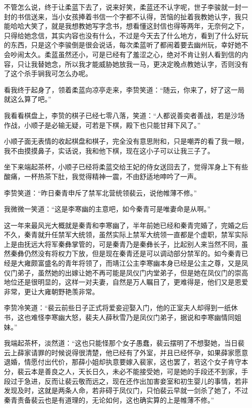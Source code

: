 不管怎么说，终于让柔蓝下去了，说来好笑，柔蓝还不认字呢，世子李骏就一封一封的书信送来，当小女孩捧着书信一个字都不认得，苦恼的扯着我教她认字，我只能哈哈大笑了，就是我想教她写字念书，想看懂这封信也得等两年，无奈何之下，只得给她念信，其实内容也没有什么，不过是今天去了什么地方，看到了什么好玩的东西，只是这个李骏倒是很会说话，每次柔蓝听了都闹着要去幽州玩，幸好她不会吵闹太久。柔蓝虽然还小，可是已经有了羞涩之心，绝对不肯让别人看到信的内容，只让我替她念，所以我才能威胁她放我一马，更决定晚点教她认字，否则没有了这个杀手锏我可怎么办呢。

看我终于起身了，领着柔蓝向凉亭走来，李贽笑道：“随云，你来了，好了这一局就这么算了吧。”

我看看棋盘上，李贽的棋子已经七零八落，笑道：“人都说善奕者善战，若是沙场作战，小顺子是必输无疑，可若是下棋，殿下也只能甘拜下风了。”

小顺子面无表情的收起棋盘和棋子，完全没有意思附和，只是嘲弄的看了我一眼，我不由摸摸鼻子，实话说，我和他下棋，现在这小子可以让我三子了。

坐下来端起茶杯，小顺子已经将柔蓝交给王妃的侍女送回去了，觉得浑身上下有些酸痛，一杯热茶下肚，我觉得精神一震，不由舒适地呻吟了一声。

李贽笑道：“昨日秦青申斥了禁军北营统领裴云，说他帷薄不修。”

我微微一笑道：“这是李寒幽的主意吧，如今秦青可是唯妻命是从啊。”

这一年来最风光大概就是秦青和李寒幽了，半年前她已经和秦青完婚了，完婚之后不久，秦青就升任禁军大统领，虽然实际上禁军大统领一直都是个虚职，禁军实际上是由抚远大将军秦彝掌管的，可是秦青乃是秦彝长子，比起别人来当然不同，虽然秦彝仍然没有将权力下放，但是现在秦青还是可以调动部分禁军的。如今秦青已经是大雍颇富盛名的青年将领了，而靖江公主李寒幽本身已经是公主之尊，又是凤仪门弟子，虽然她的出嫁让她不再可能是凤仪门内堂弟子，但是她在凤仪门的崇高地位还是很明显的，这样一对夫妻，自然是万人瞩目了，更难得是，他们又是恩爱非常，更让大雍朝野艳羡非常。

李贽冷笑道：“裴云前些日子正式将爱妾迎娶入门，他的正室夫人却得到一纸休书，这也难怪李寒幽大怒，裴夫人薛秋雪乃是凤仪门弟子，据说和李寒幽情同姐妹。”

我端起茶杯，淡然道：“这也只能怪那个女子愚蠢，裴云摆明了不想娶她，当日裴云上薛家请罪的时候说得很清楚，他已经有了外室，并且已经怀孕，如果薛家愿意退婚，情愿付出代价，那薛小姐却执意要嫁入裴家，这也罢了，若这个女子肯守本分，裴云本是善良之人，天长日久，未必不能接受她，可是她的手段还不到家，手段过于急进，反而让裴云敬而远之，现在还作出加害妾室和初生婴儿的事情，若非发现及时，这就是两条人命，若非碍于凤仪门，只怕裴云早就一剑杀了她了，不过秦青责备裴云也是有道理的，无论如何，这也确实算的上是帷薄不修。”

